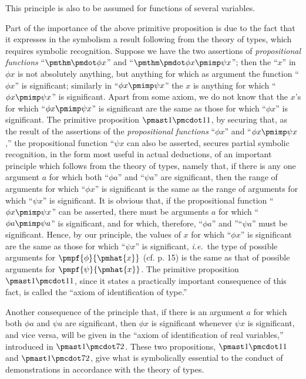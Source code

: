 \documentclass[letterpaper,12pt,openany,leqno]{book}
\newcommand{\pagefirst}[1]{\marginnote[\boxed{\text{#1}}]{\boxed{\text{#1}}}}
\begin{document}
This principle is also to be assumed for functions of several variables.

Part of the importance of the above primitive proposition is due to the fact that it expresses in the symbolism a result following from the theory of types, which requires symbolic recognition. Suppose we have the two assertions of \textit{propositional functions} ``$\pmthm \pmdot \phi x$'' and ``$\pmthm \pmdot \phi x \pmimp \psi x$''; then the ``$x$'' in $\phi x$ is not absolutely anything, but anything for which as argument the function ``$\phi x$'' is significant; similarly in ``$\phi x \pmimp \psi x$'' the $x$ is anything for which ``$\phi x \pmimp \psi x$'' is significant. Apart from some axiom, we do not know that the $x$'s for which ``$\phi x \pmimp \psi x$'' is significant are the same as those for which ``$\phi x$'' is significant. The \pagefirst{100} primitive proposition $\pmast1\pmcdot11$, by securing that, as the result of the assertions of the \textit{propositional functions} ``$\phi x$'' and ``$\phi x \pmimp \psi x$,'' the propositional function ``$\psi x$ can also be asserted, secures partial symbolic recognition, in the form most useful in actual deductions, of an important principle which follows from the theory of types, namely that, if there is any one argument $a$ for which both ``$\phi a$'' and ``$\psi a$'' are significant, then the range of arguments for which ``$\phi x$'' is significant is the same as the range of arguments for which ``$\psi x$'' is significant. It is obvious that, if the propositional function ``$\phi x \pmimp \psi x$'' can be asserted, there must be arguments $a$ for which ``$\phi a \pmimp \psi a$'' is significant, and for which, therefore, ``$\phi a$'' and ''``$\psi a$'' must be significant. Hence, by our principle, the values of $x$ for which ``$\phi x$'' is significant are the same as those for which ``$\psi x$'' is significant, \textit{i.e.}\ the type of possible arguments for $\pmpf{\phi}{\pmhat{x}}$ (cf. p. 15) is the same as that of possible arguments for $\pmpf{\psi}{\pmhat{x}}$. The primitive proposition $\pmast1\pmcdot11$, since it states a practically important consequence of this fact, is called the ``axiom of identification of type.''

Another consequence of the principle that, if there is an argument $a$ for which both $\phi a$ and $\psi a$ are significant, then $\phi x$ is significant whenever $\psi x$ is significant, and vice versa, will be given in the ``axiom of identification of real variables,'' introduced in $\pmast1\pmcdot72$. These two propositions, $\pmast1\pmcdot11$ and $\pmast1\pmcdot72$, give what is symbolically essential to the conduct of demonstrations in accordance with the theory of types.
\end{document}
